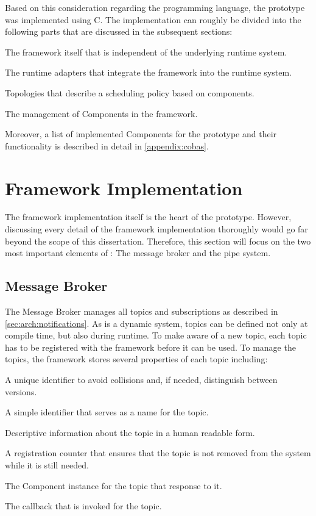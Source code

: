 Based on this consideration regarding the programming language, the \cobas{} prototype was implemented using C. The implementation can roughly be divided into the following parts that are discussed in the subsequent sections:

\vspace{-0.33cm}
\begin{enumerate*}
	\item The framework itself that is independent of the underlying runtime system.
	\item The runtime adapters that integrate the framework into the runtime system.
	\item Topologies that describe a scheduling policy based on \cobas{} components.
	\item The management of Components in the \cobas{} framework.
\end{enumerate*}

Moreover, a list of implemented Components for the prototype and their functionality is described in detail in \cref{appendix:cobas}.

\section{Framework Implementation}

The framework implementation itself is the heart of the \cobas{} prototype. However, discussing every detail of the framework implementation thoroughly would go far beyond the scope of this dissertation. Therefore, this section will focus on the two most important elements of \cobas{}: The message broker and the pipe system.

\subsection{Message Broker}%
\label{sec:impl:fw:broker}

The \cobas{} Message Broker manages all topics and subscriptions as described in \cref{sec:arch:notifications}. As \cobas{} is a dynamic system, topics can be defined not only at compile time, but also during runtime. To make \cobas{} aware of a new topic, each topic has to be registered with the framework before it can be used. To manage the topics, the framework stores several properties of each topic including:

\begin{itemize*}
	\item A unique identifier to avoid collisions and, if needed, distinguish between versions.
	\item A simple identifier that serves as a name for the topic.
	\item Descriptive information about the topic in a human readable form.
	\item A registration counter that ensures that the topic is not removed from the system while it is still needed.
	\item The Component instance for the topic that response to it.
	\item The callback that is invoked for the topic.
\end{itemize*}

